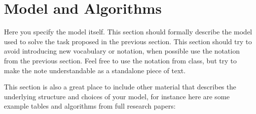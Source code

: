 \documentclass[11pt]{article}
\begin{document}
\section{Model and Algorithms}

Here you specify the model itself. This section should formally
describe the model used to solve the task proposed in the previous
section. This section should try to avoid introducing new vocabulary
or notation, when possible use the notation from the previous section.
Feel free to use the notation from class, but try to make the note
understandable as a standalone piece of text.

This section is also a great place to include other material that
describes the underlying structure and choices of your model, for
instance here are some example tables and algorithms from full
research papers:
\end{document}
